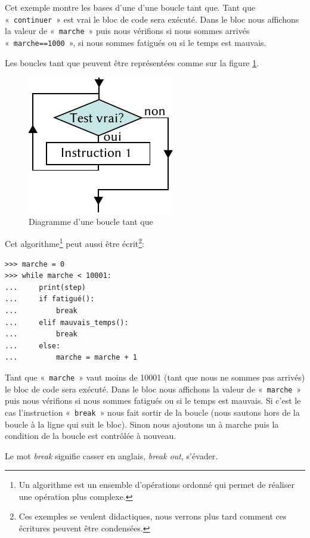 Cet exemple montre les bases d'une d'une boucle tant que. Tant que «~\texttt{continuer}~» est vrai le bloc de code sera exécuté. Dans le bloc nous affichons la valeur de «~\texttt{marche}~» puis nous vérifions si nous sommes arrivés «~\texttt{marche==1000}~», si nous sommes fatigués ou si le temps est mauvais.

Les boucles tant que peuvent être représentées comme sur la figure \ref{fig:Cf-while-fr}.
\begin{figure}[h!]
\centering
\includegraphics[scale=1.5]{images/Cf-while-fr.pdf}
\caption{Diagramme d'une boucle tant que}
\label{fig:Cf-while-fr}
\end{figure}

Cet algorithme\footnote{Un algorithme est un ensemble d'opérations ordonné qui permet de réaliser une opération plus complexe.} peut aussi être écrit\footnote{Ces exemples se veulent didactiques, nous verrons plus tard comment ces écritures peuvent être condensées.}:

\begin{Verbatim}[frame=single,rulecolor=\color{gray}, label=ne pas saisir]
>>> marche = 0
>>> while marche < 10001:
...     print(step)
...     if fatigué():
...         break
...     elif mauvais_temps():
...         break
...     else:
...         marche = marche + 1 
\end{Verbatim}

Tant que «~\texttt{marche}~» vaut moins de 10001 (tant que nous ne sommes pas arrivés) le bloc de code sera exécuté. Dans le bloc nous affichons la valeur de «~\texttt{marche}~» puis nous vérifions si nous sommes fatigués ou si le temps est mauvais. Si c'est le cas l'instruction «~\texttt{break}~» nous fait sortir de la boucle (nous sautons hors de la boucle à la ligne qui suit le bloc). Sinon nous ajoutons un à marche puis la condition de la boucle est contrôlée à nouveau.

Le mot \emph{break} signifie casser en anglais, \emph{break out}, s'évader.\\


